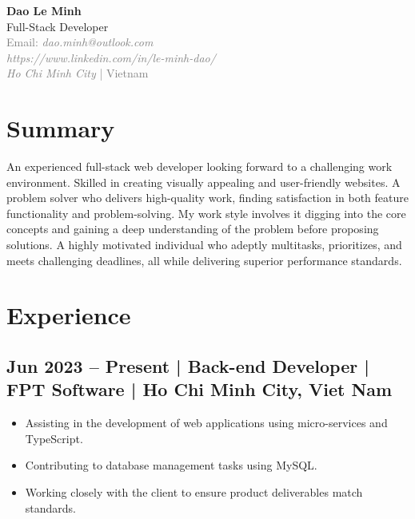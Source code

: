 \documentclass[letterpaper,11pt]{article}
\begin{document}
\pagestyle{empty}

\begin{center}
    \textbf{\Huge Dao Le Minh} \\
    \vspace{2mm}
    Full-Stack Developer \\
    \vspace{2mm}
    \textcolor{gray}{Email: \textit{dao.minh@outlook.com}} \\
    \vspace{2mm}
    \textcolor{gray}{\textit{https://www.linkedin.com/in/le-minh-dao/}} \\
    \vspace{2mm}
    \textcolor{gray}{\textit{Ho Chi Minh City} | Vietnam}
\end{center}

\section*{Summary}
An experienced full-stack web developer looking forward to a challenging work environment. Skilled in creating visually appealing and user-friendly websites. A problem solver who delivers high-quality work, finding satisfaction in both feature functionality and problem-solving. My work style involves it digging into the core concepts and gaining a deep understanding of the problem before proposing solutions. A highly motivated individual who adeptly multitasks, prioritizes, and meets challenging deadlines, all while delivering superior performance standards.

\section*{Experience}
\subsection*{Jun 2023 -- Present | Back-end Developer | FPT Software | Ho Chi Minh City, Viet Nam}
\begin{itemize}
    \item Assisting in the development of web applications using micro-services and TypeScript.
    \item Contributing to database management tasks using MySQL.
    \item Working closely with the client to ensure product deliverables match standards.
\end{itemize}
\end{document}
